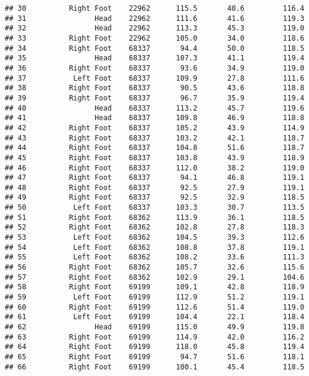 \documentclass[]{article}
\begin{document}
\begin{verbatim}
## 30          Right Foot    22962      115.5       40.6         116.4
## 31                Head    22962      111.6       41.6         119.3
## 32                Head    22962      113.3       45.3         119.0
## 33          Right Foot    22962      105.0       34.0         118.6
## 34          Right Foot    68337       94.4       50.0         118.5
## 35                Head    68337      107.3       41.1         119.4
## 36          Right Foot    68337       93.6       34.9         119.0
## 37           Left Foot    68337      109.9       27.8         111.6
## 38          Right Foot    68337       90.5       43.6         118.8
## 39          Right Foot    68337       96.7       35.9         119.4
## 40                Head    68337      113.2       45.7         119.6
## 41                Head    68337      109.8       46.9         118.8
## 42          Right Foot    68337      105.2       43.9         114.9
## 43          Right Foot    68337      103.2       42.1         118.7
## 44          Right Foot    68337      104.8       51.6         118.7
## 45          Right Foot    68337      103.8       43.9         118.9
## 46          Right Foot    68337      112.0       38.2         119.0
## 47          Right Foot    68337       94.1       46.8         119.1
## 48          Right Foot    68337       92.5       27.9         119.1
## 49          Right Foot    68337       92.5       32.9         118.5
## 50           Left Foot    68337      103.3       30.7         113.5
## 51          Right Foot    68362      113.9       36.1         118.5
## 52          Right Foot    68362      102.8       27.8         118.3
## 53           Left Foot    68362      104.5       39.3         112.6
## 54           Left Foot    68362      108.8       37.8         119.1
## 55           Left Foot    68362      108.2       33.6         111.3
## 56          Right Foot    68362      105.7       32.6         115.6
## 57          Right Foot    68362      102.9       29.1         104.6
## 58          Right Foot    69199      109.1       42.8         118.9
## 59           Left Foot    69199      112.9       51.2         119.1
## 60          Right Foot    69199      112.6       51.4         119.0
## 61           Left Foot    69199      104.4       22.1         118.4
## 62                Head    69199      115.0       49.9         119.8
## 63          Right Foot    69199      114.9       42.0         116.2
## 64          Right Foot    69199      118.0       45.8         119.4
## 65          Right Foot    69199       94.7       51.6         118.1
## 66          Right Foot    69199      100.1       45.4         118.5

\end{verbatim}
\end{document}
